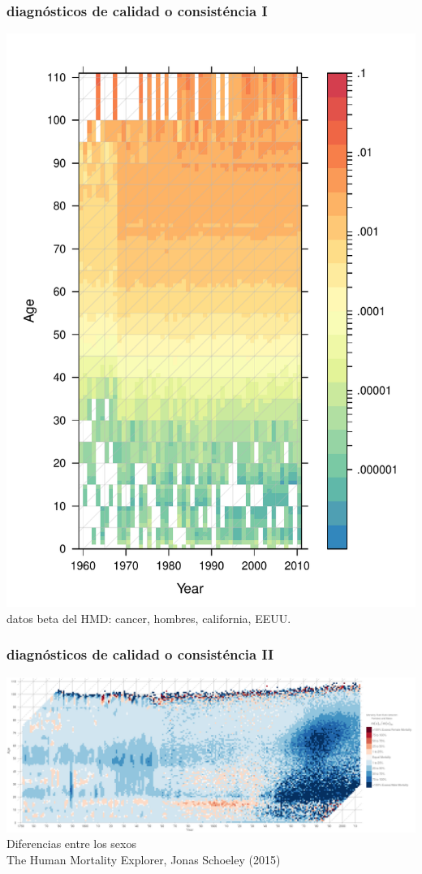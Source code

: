 \documentclass[20pt]{beamer}
\begin{document}
\begin{frame}
\frametitle{diagn\'{o}sticos de calidad o consist\'{e}ncia I}
\includegraphics[scale=.8]{Figures/APC_males_CA_cancer.pdf}\\
datos beta del HMD: cancer, hombres, california, EEUU.
\end{frame}

\begin{frame}
\frametitle{diagn\'{o}sticos de calidad o consist\'{e}ncia II}
\includegraphics[scale=.55]{Figures/Schoeley.png}\\
Diferencias entre los sexos\\The Human Mortality Explorer, Jonas Schoeley
(2015)
\end{frame}
\end{document}
